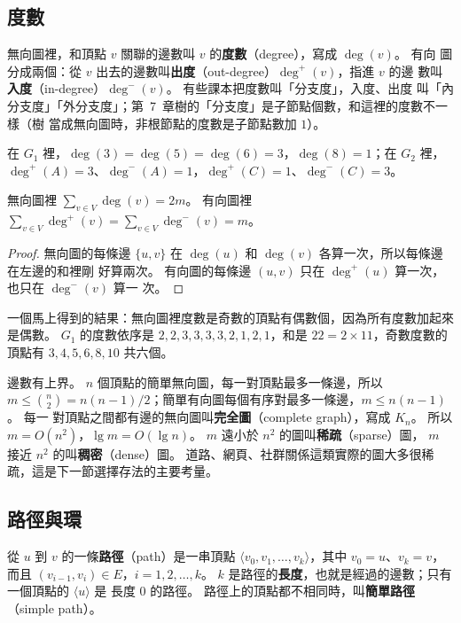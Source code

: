\subsection{度數}

無向圖裡，和頂點 $v$ 關聯的邊數叫 $v$ 的\textbf{度數}（degree），寫成 $\deg(v)$。 有向
圖分成兩個：從 $v$ 出去的邊數叫\textbf{出度}（out-degree）$\deg^{+}(v)$，指進 $v$ 的邊
數叫\textbf{入度}（in-degree）$\deg^{-}(v)$。 有些課本把度數叫「分支度」，入度、出度
叫「內分支度」「外分支度」；第~7~章樹的「分支度」是子節點個數，和這裡的度數不一樣（樹
當成無向圖時，非根節點的度數是子節點數加 $1$）。

在 $G_1$ 裡，$\deg(3) = \deg(5) = \deg(6) = 3$，$\deg(8) = 1$；在 $G_2$ 裡，
$\deg^{+}(A) = 3$、$\deg^{-}(A) = 1$，$\deg^{+}(C) = 1$、$\deg^{-}(C) = 3$。

\begin{theorem}[握手定理]
\label{thm:gtr-handshake}
無向圖裡 $\displaystyle\sum_{v \in V} \deg(v) = 2m$。 有向圖裡
$\displaystyle\sum_{v \in V} \deg^{+}(v) = \sum_{v \in V} \deg^{-}(v) = m$。
\end{theorem}

\begin{proof}
無向圖的每條邊 $\{u, v\}$ 在 $\deg(u)$ 和 $\deg(v)$ 各算一次，所以每條邊在左邊的和裡剛
好算兩次。 有向圖的每條邊 $(u, v)$ 只在 $\deg^{+}(u)$ 算一次，也只在 $\deg^{-}(v)$ 算一
次。
\end{proof}

一個馬上得到的結果：無向圖裡度數是奇數的頂點有偶數個，因為所有度數加起來是偶數。
$G_1$ 的度數依序是 $2, 2, 3, 3, 3, 3, 2, 1, 2, 1$，和是 $22 = 2 \times 11$，奇數度數的
頂點有 $3, 4, 5, 6, 8, 10$ 共六個。

邊數有上界。 $n$ 個頂點的簡單無向圖，每一對頂點最多一條邊，所以
$m \le \binom{n}{2} = n(n-1)/2$；簡單有向圖每個有序對最多一條邊，$m \le n(n-1)$。 每一
對頂點之間都有邊的無向圖叫\textbf{完全圖}（complete graph），寫成 $K_n$。 所以
$m = O(n^2)$，$\lg m = O(\lg n)$。 $m$ 遠小於 $n^2$ 的圖叫\textbf{稀疏}（sparse）圖，
$m$ 接近 $n^2$ 的叫\textbf{稠密}（dense）圖。 道路、網頁、社群關係這類實際的圖大多很稀
疏，這是下一節選擇存法的主要考量。

\subsection{路徑與環}

\begin{definition}[路徑]
\label{def:gtr-path}
從 $u$ 到 $v$ 的一條\textbf{路徑}（path）是一串頂點 $\langle v_0, v_1, \ldots, v_k
\rangle$，其中 $v_0 = u$、$v_k = v$，而且 $(v_{i-1}, v_i) \in E$，$i = 1, 2, \ldots,
k$。 $k$ 是路徑的\textbf{長度}，也就是經過的邊數；只有一個頂點的 $\langle u \rangle$ 是
長度 $0$ 的路徑。 路徑上的頂點都不相同時，叫\textbf{簡單路徑}（simple path）。
\end{definition}

